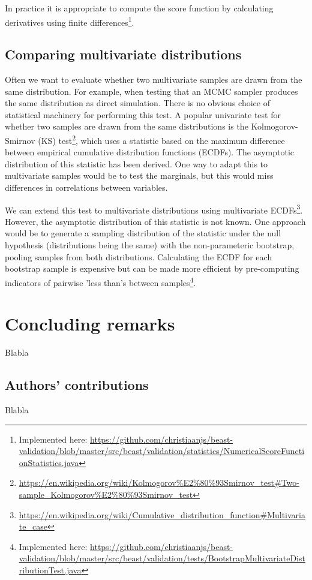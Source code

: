\documentclass[oneside,twocolumn]{article}
\begin{document}
In practice it is appropriate to compute the score function by calculating derivatives using finite differences\footnote{Implemented here: \url{https://github.com/christiaanjs/beast-validation/blob/master/src/beast/validation/statistics/NumericalScoreFunctionStatistics.java}}.

\subsection{Comparing multivariate distributions}

Often we want to evaluate whether two multivariate samples are drawn from the same distribution. For example, when testing that an MCMC sampler produces the same distribution as direct simulation. There is no obvious choice of statistical machinery for performing this test. A popular univariate test for whether two samples are drawn from the same distributions is the Kolmogorov-Smirnov (KS) test\footnote{\url{https://en.wikipedia.org/wiki/Kolmogorov\%E2\%80\%93Smirnov_test\#Two-sample_Kolmogorov\%E2\%80\%93Smirnov_test}}, which uses a statistic based on the maximum difference between empirical cumulative distribution functions (ECDFs). The asymptotic distribution of this statistic has been derived. One way to adapt this to multivariate samples would be to test the marginals, but this would miss differences in correlations between variables.

We can extend this test to multivariate distributions using multivariate ECDFs\footnote{\url{https://en.wikipedia.org/wiki/Cumulative_distribution_function\#Multivariate_case}}. However, the asymptotic distribution of this statistic is not known. One approach would be to generate a sampling distribution of the statistic under the null hypothesis (distributions being the same) with the non-parameteric bootstrap, pooling samples from both distributions. Calculating the ECDF for each bootstrap sample is expensive but can be made more efficient by pre-computing indicators of pairwise 'less than's between samples\footnote{Implemented here: \url{https://github.com/christiaanjs/beast-validation/blob/master/src/beast/validation/tests/BootstrapMultivariateDistributionTest.java}}.

\section*{Concluding remarks}
Blabla

\subsection*{Authors' contributions}
Blabla
\end{document}

